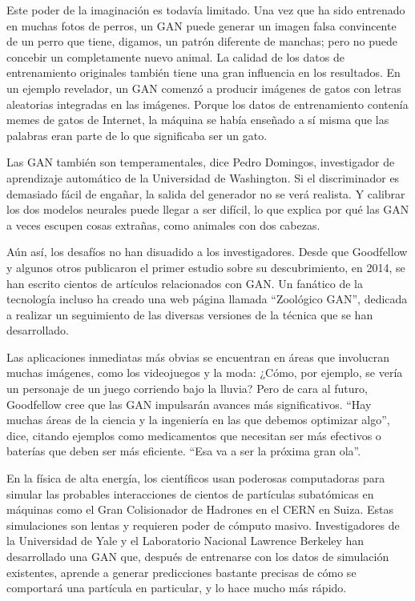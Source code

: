 \documentclass[a4paper]{article}
\begin{document}
Este poder de la imaginación es todavía limitado. Una vez que ha 
sido entrenado en muchas fotos de perros, un GAN puede generar un
imagen falsa convincente de un perro que tiene, digamos, un patrón 
diferente de manchas; pero no puede concebir un completamente 
nuevo animal. La calidad de los datos de entrenamiento originales 
también tiene una gran influencia en los resultados. En un ejemplo 
revelador, un GAN comenzó a producir imágenes de gatos con letras 
aleatorias integradas en las imágenes. Porque los datos de 
entrenamiento contenía memes de gatos de Internet, la máquina se 
había enseñado a sí misma que las palabras eran parte de lo que 
significaba ser un gato.

Las GAN también son temperamentales, dice Pedro Domingos, 
investigador de aprendizaje automático de la Universidad de 
Washington. Si el
discriminador es demasiado fácil de engañar, la salida del 
generador no se verá realista. Y calibrar los dos modelos 
neurales puede llegar a ser difícil, lo que explica por qué las 
GAN a veces escupen cosas extrañas, como animales con dos cabezas.

Aún así, los desafíos no han disuadido a los investigadores. Desde 
que Goodfellow y algunos otros publicaron el primer estudio sobre 
su descubrimiento, en 2014, se han escrito cientos de artículos 
relacionados con GAN. Un fanático de la tecnología incluso ha 
creado una web página llamada ``Zoológico GAN'', dedicada a 
realizar un seguimiento de las diversas versiones de la técnica 
que se han desarrollado.

Las aplicaciones inmediatas más obvias se encuentran en áreas que 
involucran muchas imágenes, como los videojuegos y la moda:
¿Cómo, por ejemplo, se vería un personaje de un juego corriendo 
bajo la lluvia? Pero de cara al futuro, Goodfellow cree que las 
GAN impulsarán avances más significativos. “Hay muchas áreas de la 
ciencia y la ingeniería en las que debemos
optimizar algo”, dice, citando ejemplos como medicamentos que 
necesitan ser más efectivos o baterías que deben
ser más eficiente. “Esa va a ser la próxima gran ola”.

En la física de alta energía, los científicos usan poderosas 
computadoras para simular las probables interacciones de cientos 
de partículas subatómicas en máquinas como el Gran Colisionador de 
Hadrones en el CERN en Suiza. Estas simulaciones son lentas y 
requieren poder de cómputo masivo. Investigadores de la 
Universidad de Yale y el Laboratorio Nacional Lawrence Berkeley 
han desarrollado una GAN que, después de entrenarse con los datos 
de simulación existentes, aprende a generar predicciones bastante 
precisas de cómo se comportará una partícula en particular, y lo 
hace mucho más rápido.
\end{document}

